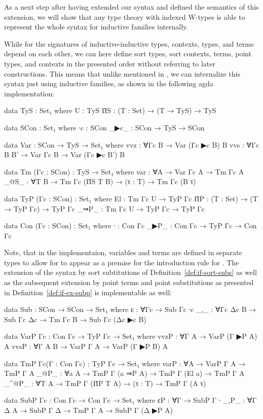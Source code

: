 
As a next step after having extended our syntax and defined the semantics of this
extension, we will show that any type theory with indexed W-types is able
to represent the whole syntax for inductive families internally.

\begin{remark}
While for the signatures of inductive-inductive types, contexts, types, and terms
depend on each other, we can here define sort types, sort contexts, terms, point
types, and contexts in the presented order without referring to later constructions.
This means that unlike mentioned in , we  can
internalize this syntax just using inductive families, as shown in the
following agda implementation:
\begin{agdacode}
data TyS : Set₁ where
  U  : TyS
  Π̂S : (T : Set) → (T → TyS) → TyS

data SCon : Set₁ where
  ∙c   : SCon
  _▶c_ : SCon → TyS → SCon

data Var : SCon → TyS → Set₁ where
  vvz : ∀{Γc B} → Var (Γc ▶c B) B
  vvs : ∀{Γc B B'} → Var Γc B → Var (Γc ▶c B') B

data Tm (Γc : SCon) : TyS → Set₁ where
  var  : ∀{A} → Var Γc A → Tm Γc A
  _@S_ : ∀{T B} → Tm Γc (Π̂S T B) → (τ : T) → Tm Γc (B τ)

data TyP (Γc : SCon) : Set₁ where
  El   : Tm Γc U → TyP Γc
  Π̂P   : (T : Set) → (T → TyP Γc) → TyP Γc
  _⇒P_ : Tm Γc U → TyP Γc → TyP Γc

data Con (Γc : SCon) : Set₁ where
  ∙    : Con Γc
  _▶P_ : Con Γc → TyP Γc → Con Γc
\end{agdacode}
Note, that in the implementaion, variables and terms are defined in separate
types to allow for  to appear as a premise for the introduction rule
for .
The extension of the syntax by sort subtitutions of Definition~\ref{def:if-sort-subs}
as well as the subsequent extension by point terms and point substitutions as presented in
Definition~\ref{def:if-ex-subp} is implementable as well:
\begin{agdacode}
data Sub : SCon → SCon → Set₁ where
  ε   : ∀{Γc} → Sub Γc ∙c
  _,_ : ∀{Γc Δc B} → Sub Γc Δc → Tm Γc B → Sub Γc (Δc ▶c B)

data VarP {Γc} : Con Γc → TyP Γc → Set₁ where
  vvzP : ∀{Γ A} → VarP (Γ ▶P A) A
  vvsP : ∀{Γ A B} → VarP Γ A → VarP (Γ ▶P B) A

data TmP {Γc}(Γ : Con Γc) : TyP Γc → Set₁ where
  varP : ∀{A} → VarP Γ A → TmP Γ A
  _@P_ : ∀{a A} → TmP Γ (a ⇒P A) → TmP Γ (El a) → TmP Γ A
  _^@P_ : ∀{T A} → TmP Γ (Π̂P T A) → (τ : T) → TmP Γ (A τ)

data SubP {Γc} : Con Γc → Con Γc → Set₁ where
  εP   : ∀{Γ} → SubP Γ ∙
  _,P_ : ∀{Γ Δ A} → SubP Γ Δ → TmP Γ A → SubP Γ (Δ ▶P A)
\end{agdacode}
\end{remark}

